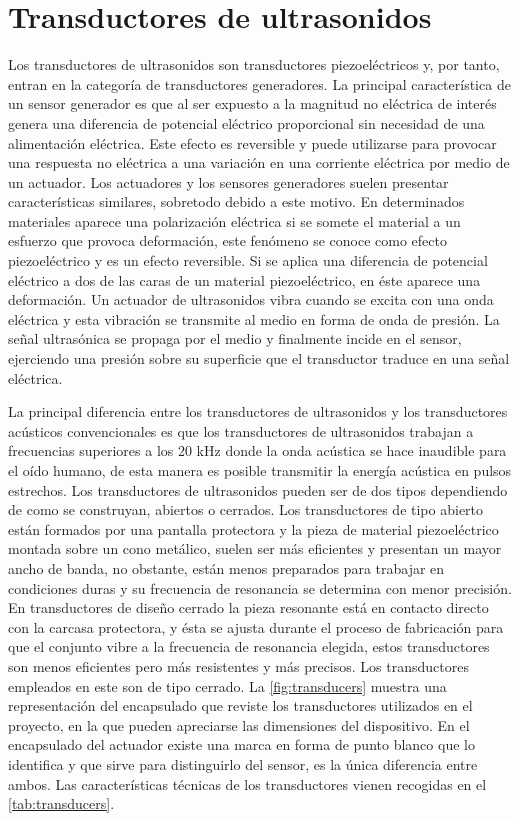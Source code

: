 \section{Transductores de ultrasonidos}\label{sec:transducers}

Los transductores de ultrasonidos son transductores piezoeléctricos y, por
tanto, entran en la categoría de transductores generadores. La principal
característica de un sensor generador es que al ser expuesto a la magnitud
no eléctrica de interés genera una diferencia de potencial eléctrico
proporcional sin necesidad de una alimentación eléctrica. Este efecto es
reversible y puede utilizarse para provocar una respuesta no eléctrica a
una variación en una corriente eléctrica por medio de un actuador. Los
actuadores y los sensores generadores suelen presentar características
similares, sobretodo debido a este motivo. En determinados materiales
aparece una polarización eléctrica si se somete el material a un esfuerzo
que provoca deformación, este fenómeno se conoce como efecto piezoeléctrico
y es un efecto reversible. Si se aplica una diferencia de potencial
eléctrico a dos de las caras de un material piezoeléctrico, en éste aparece
una deformación. Un actuador de ultrasonidos vibra cuando se excita con una
onda eléctrica y esta vibración se transmite al medio en forma de onda de
presión. La señal ultrasónica se propaga por el medio y finalmente incide
en el sensor, ejerciendo una presión sobre su superficie que el transductor
traduce en una señal eléctrica.

La principal diferencia entre los transductores de ultrasonidos y los
transductores acústicos convencionales es que los transductores de
ultrasonidos trabajan a frecuencias superiores a los 20 kHz donde la onda
acústica se hace inaudible para el oído humano, de esta manera es posible
transmitir la energía acústica en pulsos estrechos. Los transductores de
ultrasonidos pueden ser de dos tipos dependiendo de como se construyan,
abiertos o cerrados. Los transductores de tipo abierto están formados por
una pantalla protectora y la pieza de material piezoeléctrico montada sobre
un cono metálico, suelen ser más eficientes y presentan un mayor ancho de
banda, no obstante, están menos preparados para trabajar en condiciones
duras y su frecuencia de resonancia se determina con menor precisión. En
transductores de diseño cerrado la pieza resonante está en contacto directo
con la carcasa protectora, y ésta se ajusta durante el proceso de
fabricación para que el conjunto vibre a la frecuencia de resonancia
elegida, estos transductores son menos eficientes pero más resistentes y
más precisos. Los transductores empleados en este  son de tipo
cerrado. La \vref{fig:transducers} muestra una representación del
encapsulado que reviste los transductores utilizados en el proyecto, en la
que pueden apreciarse las dimensiones del dispositivo. En el encapsulado
del actuador existe una marca en forma de punto blanco que lo identifica y
que sirve para distinguirlo del sensor, es la única diferencia entre ambos.
Las características técnicas de los transductores vienen recogidas en el
\cref{tab:transducers}.

